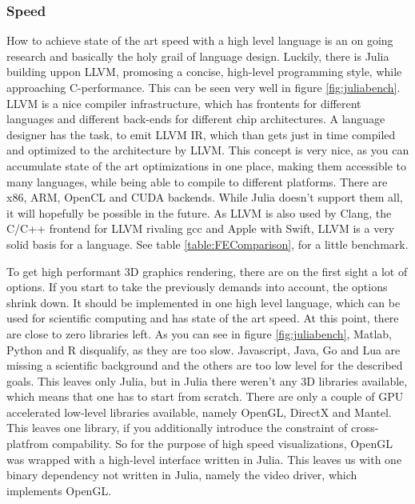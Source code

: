 \subsubsection{Speed}

How to achieve state of the art speed with a high level language is an on going research and basically the holy grail of language design.
Luckily, there is Julia building uppon \ac{LLVM}, promosing a concise, high-level programming style, while approaching C-performance. This can be seen very well in figure \ref{fig:juliabench}.
\ac{LLVM} is a nice compiler infrastructure, which has frontents for different languages and different back-ends for different chip architectures. 
A language designer has the task, to emit \ac{LLVM} \ac{IR}, which than gets just in time compiled and optimized to the architecture by \ac{LLVM}.
This concept is very nice, as you can accumulate state of the art optimizations in one place, making them accessible to many languages, while being able to compile to different platforms. There are x86, ARM, OpenCL and CUDA backends. While Julia doesn't support them all, it will hopefully be possible in the future. 
As \ac{LLVM} is also used by Clang, the C/C++ frontend for \ac{LLVM} rivaling gcc and Apple with Swift, \ac{LLVM} is a very solid basis for a language.
See table \ref{table:FEComparison}, for a little benchmark.

To get high performant 3D graphics rendering, there are on the first sight a lot of options.
If you start to take the previously demands into account, the options shrink down.
It should be implemented in one high level language, which can be used for scientific computing and has state of the art speed. At this point, there are close to zero libraries left. As you can see in figure \ref{fig:juliabench}, Matlab, Python and R disqualify, as they are too slow. Javascript, Java, Go and Lua are missing a scientific background and the others are too low level for the described goals.
This leaves only Julia, but in Julia there weren't any 3D libraries available, which means that one has to start from scratch.
There are only a couple of GPU accelerated low-level libraries available, namely OpenGL, DirectX and Mantel. This leaves one library, if you additionally introduce the constraint of cross-platfrom compability.
So for the purpose of high speed visualizations, OpenGL was wrapped with a high-level interface written in Julia. This leaves us with one binary dependency not written in Julia, namely the video driver, which implements OpenGL.

